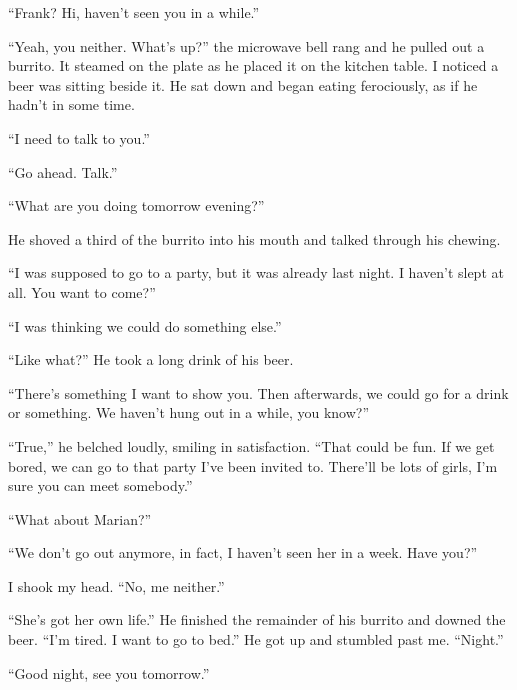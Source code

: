 \documentclass[
]{article}
\begin{document}
``Frank? Hi, haven't seen you in a while.''

``Yeah, you neither. What's up?'' the microwave bell rang and he pulled
out a burrito. It steamed on the plate as he placed it on the kitchen
table. I noticed a beer was sitting beside it. He sat down and began
eating ferociously, as if he hadn't in some time.

``I need to talk to you.''

``Go ahead. Talk.''

``What are you doing tomorrow evening?''

He shoved a third of the burrito into his mouth and talked through his
chewing.

``I was supposed to go to a party, but it was already last night. I
haven't slept at all. You want to come?''

``I was thinking we could do something else.''

``Like what?'' He took a long drink of his beer.

``There's something I want to show you. Then afterwards, we could go for
a drink or something. We haven't hung out in a while, you know?''

``True,'' he belched loudly, smiling in satisfaction. ``That could be
fun. If we get bored, we can go to that party I've been invited to.
There'll be lots of girls, I'm sure you can meet somebody.''

``What about Marian?''

``We don't go out anymore, in fact, I haven't seen her in a week. Have
you?''

I shook my head. ``No, me neither.''

``She's got her own life.'' He finished the remainder of his burrito and
downed the beer. ``I'm tired. I want to go to bed.'' He got up and
stumbled past me. ``Night.''

``Good night, see you tomorrow.''
\end{document}
